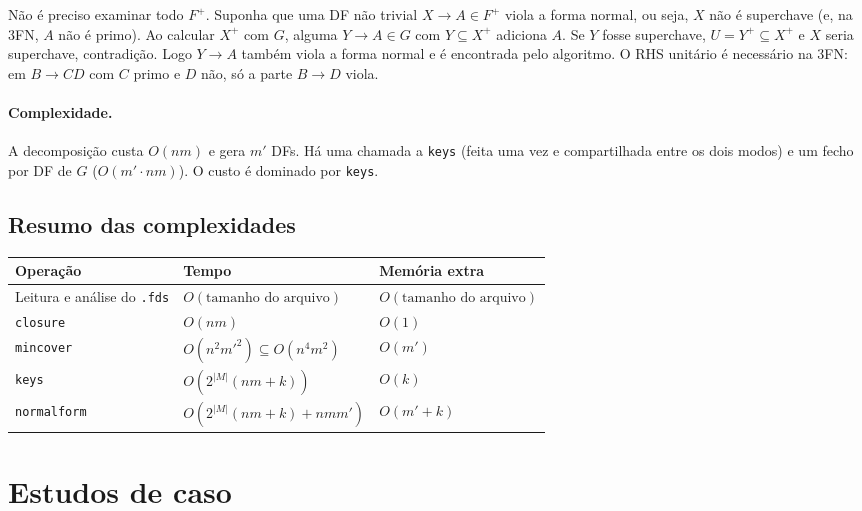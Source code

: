 \documentclass[11pt,a4paper]{article}
\newcommand{\fd}[2]{\ensuremath{#1 \to #2}}
\newcommand{\cl}[1]{\ensuremath{#1^{+}}}
\newcommand{\cmd}[1]{\texttt{#1}}
\begin{document}
Não é preciso examinar todo \cl{F}. Suponha que uma DF não trivial
$\fd{X}{A} \in \cl{F}$ viola a forma normal, ou seja, $X$ não é superchave
(e, na 3FN, $A$ não é primo). Ao calcular \cl{X} com $G$, alguma
$\fd{Y}{A} \in G$ com $Y \subseteq \cl{X}$ adiciona $A$. Se $Y$ fosse
superchave, $U = \cl{Y} \subseteq \cl{X}$ e $X$ seria superchave, contradição.
Logo \fd{Y}{A} também viola a forma normal e é encontrada pelo algoritmo. O
RHS unitário é necessário na 3FN: em \fd{B}{CD} com $C$ primo e $D$ não, só a
parte \fd{B}{D} viola.

\paragraph{Complexidade.} A decomposição custa $O(n m)$ e gera $m'$ DFs. Há
uma chamada a \cmd{keys} (feita uma vez e compartilhada entre os dois modos) e
um fecho por DF de $G$ ($O(m' \cdot n m)$). O custo é dominado por
\cmd{keys}.




\subsection{Resumo das complexidades}

\begin{center}
    \begin{tabular}{lll}
        \toprule
        Operação & Tempo & Memória extra \\
        \midrule
        Leitura e análise do \texttt{.fds} & $O(\text{tamanho do arquivo})$ & $O(\text{tamanho do arquivo})$ \\
        \cmd{closure} & $O(n m)$ & $O(1)$ \\
        \cmd{mincover} & $O(n^2 m'^2) \subseteq O(n^4 m^2)$ & $O(m')$ \\
        \cmd{keys} & $O(2^{|M|}(n m + k))$ & $O(k)$ \\
        \cmd{normalform} & $O(2^{|M|}(n m + k) + n m m')$ & $O(m' + k)$ \\
        \bottomrule
    \end{tabular}
\end{center}






\section{Estudos de caso}
\end{document}

